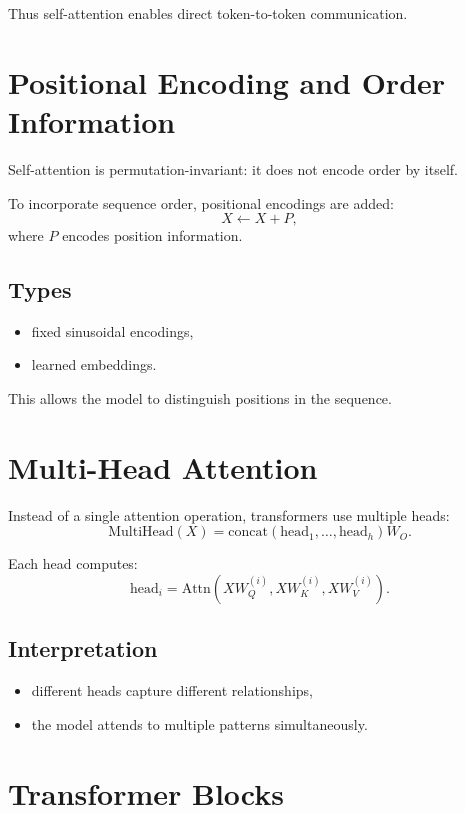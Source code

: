 Thus self-attention enables direct token-to-token communication.

\section{Positional Encoding and Order Information}

Self-attention is permutation-invariant: it does not encode order by itself.

To incorporate sequence order, positional encodings are added:
\[
X \leftarrow X + P,
\]
where $P$ encodes position information.

\subsection{Types}

\begin{itemize}
    \item fixed sinusoidal encodings,
    \item learned embeddings.
\end{itemize}

This allows the model to distinguish positions in the sequence.

\section{Multi-Head Attention}

Instead of a single attention operation, transformers use multiple heads:
\[
\mathrm{MultiHead}(X) = \mathrm{concat}(\mathrm{head}_1,\dots,\mathrm{head}_h) W_O.
\]

Each head computes:
\[
\mathrm{head}_i = \mathrm{Attn}(X W_Q^{(i)}, X W_K^{(i)}, X W_V^{(i)}).
\]

\subsection{Interpretation}

\begin{itemize}
    \item different heads capture different relationships,
    \item the model attends to multiple patterns simultaneously.
\end{itemize}

\section{Transformer Blocks}

